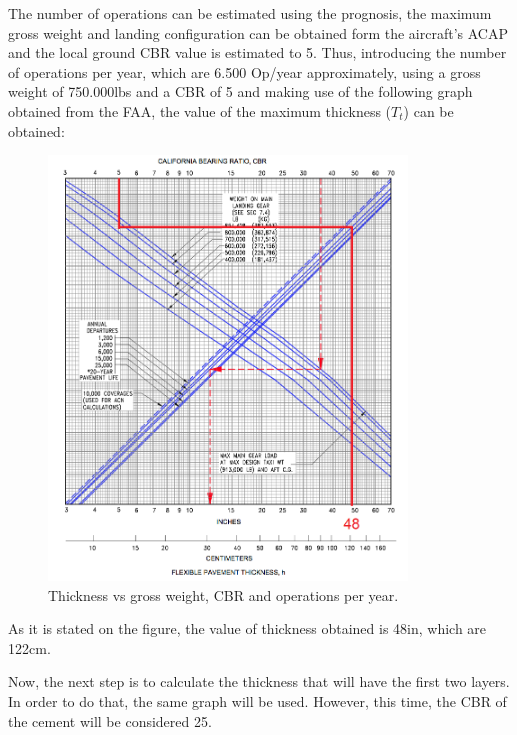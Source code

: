 		The number of operations can be estimated using the prognosis, the maximum gross weight and landing configuration can be obtained form the aircraft's ACAP and the local ground CBR value is estimated to 5. Thus, introducing the number of operations per year, which are 6.500 Op/year approximately, using a gross weight of 750.000lbs and a CBR of 5 and making use of the following graph obtained from the FAA, the value of the maximum thickness (\(T_{t}\)) can be obtained:
	   
		\begin{figure}[H]
			\centering
			\includegraphics[clip, trim=0cm 0cm 0cm 0cm, width=0.85\textwidth]{./images/pavement/B777/thickness}
			\caption{Thickness vs gross weight, CBR and operations per year.}
			\label{} %
		\end{figure}
	
		As it is stated on the figure, the  value of thickness obtained is 48in, which are 122cm. 
		
		Now, the next step is to calculate the thickness that will have the first two layers. In order to do that, the same graph will be used. However, this time, the CBR of the cement will be considered 25. 
		
